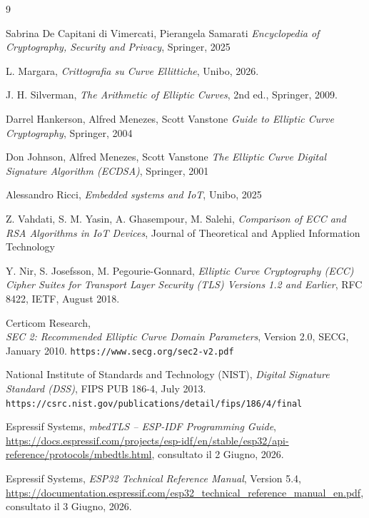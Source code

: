 \documentclass[12pt, a4paper]{report}
\begin{document}
\begin{thebibliography}{9}

    Sabrina De Capitani di Vimercati, Pierangela Samarati 
    \textit{Encyclopedia of Cryptography, Security and Privacy}, Springer, 2025

    L. Margara, \textit{Crittografia su Curve Ellittiche}, Unibo, 2026.

    J. H. Silverman, \textit{The Arithmetic of Elliptic Curves}, 
    2nd ed., Springer, 2009.
    
    Darrel Hankerson, Alfred Menezes, Scott Vanstone \textit{Guide to Elliptic Curve Cryptography}, Springer, 2004
    
    Don Johnson, Alfred Menezes, Scott Vanstone \textit{The Elliptic Curve Digital Signature Algorithm (ECDSA)}, Springer, 2001
    
    Alessandro Ricci, \textit{Embedded systems and IoT}, Unibo, 2025

    Z. Vahdati, S. M. Yasin, A. Ghasempour, M. Salehi,
    \textit{Comparison of ECC and RSA Algorithms in IoT Devices},
    Journal of Theoretical and Applied Information Technology

    Y. Nir, S. Josefsson, M. Pegourie-Gonnard,
    \textit{Elliptic Curve Cryptography (ECC) Cipher Suites for Transport Layer Security (TLS) Versions 1.2 and Earlier},
    RFC 8422, IETF, August 2018.

    Certicom Research,\\
    \textit{SEC 2: Recommended Elliptic Curve Domain Parameters},
    Version 2.0, SECG, January 2010.
    \texttt{https://www.secg.org/sec2-v2.pdf}

    National Institute of Standards and Technology (NIST),
    \textit{Digital Signature Standard (DSS)},
    FIPS PUB 186-4, July 2013.
    \newline
    \texttt{https://csrc.nist.gov/publications/detail/fips/186/4/final}

    Espressif Systems, \textit{mbedTLS -- ESP-IDF Programming Guide},
    \url{https://docs.espressif.com/projects/esp-idf/en/stable/esp32/api-reference/protocols/mbedtls.html},
    consultato il 2 Giugno, 2026.

    Espressif Systems,
    \textit{ESP32 Technical Reference Manual},
    Version 5.4,
    \url{https://documentation.espressif.com/esp32_technical_reference_manual_en.pdf},
    consultato il 3 Giugno, 2026.


\end{thebibliography}
\end{document}
